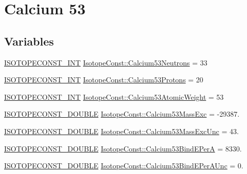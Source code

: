 \hypertarget{group___isotope_const-_calcium-_ca53}{}\section{Calcium 53}
\label{group___isotope_const-_calcium-_ca53}
\subsection*{Variables}
\begin{DoxyCompactItemize}
\item 
\mbox{\hyperlink{group___isotope_const-_macros_ga5f18360b3e99483a35c32d789e62621c}{I\+S\+O\+T\+O\+P\+E\+C\+O\+N\+S\+T\+\_\+\+I\+NT}} \mbox{\hyperlink{group___isotope_const-_calcium-_ca53_ga57c4847d66ff2899c56688d1ebc0bbe0}{Isotope\+Const\+::\+Calcium53\+Neutrons}} = 33
\item 
\mbox{\hyperlink{group___isotope_const-_macros_ga5f18360b3e99483a35c32d789e62621c}{I\+S\+O\+T\+O\+P\+E\+C\+O\+N\+S\+T\+\_\+\+I\+NT}} \mbox{\hyperlink{group___isotope_const-_calcium-_ca53_ga1bfb19fad118eebc96b4505f5ec441f9}{Isotope\+Const\+::\+Calcium53\+Protons}} = 20
\item 
\mbox{\hyperlink{group___isotope_const-_macros_ga5f18360b3e99483a35c32d789e62621c}{I\+S\+O\+T\+O\+P\+E\+C\+O\+N\+S\+T\+\_\+\+I\+NT}} \mbox{\hyperlink{group___isotope_const-_calcium-_ca53_gac76f80970411b4d5e64e327587920ee5}{Isotope\+Const\+::\+Calcium53\+Atomic\+Weight}} = 53
\item 
\mbox{\hyperlink{group___isotope_const-_macros_ga8f45a7272ce02c0b4c65c44636ed719a}{I\+S\+O\+T\+O\+P\+E\+C\+O\+N\+S\+T\+\_\+\+D\+O\+U\+B\+LE}} \mbox{\hyperlink{group___isotope_const-_calcium-_ca53_ga785835c89cadb8b5ba9963ea56235baf}{Isotope\+Const\+::\+Calcium53\+Mass\+Exc}} = -\/29387.
\item 
\mbox{\hyperlink{group___isotope_const-_macros_ga8f45a7272ce02c0b4c65c44636ed719a}{I\+S\+O\+T\+O\+P\+E\+C\+O\+N\+S\+T\+\_\+\+D\+O\+U\+B\+LE}} \mbox{\hyperlink{group___isotope_const-_calcium-_ca53_ga8104c5c4439b71ec543fc30f41ebcb0f}{Isotope\+Const\+::\+Calcium53\+Mass\+Exc\+Unc}} = 43.
\item 
\mbox{\hyperlink{group___isotope_const-_macros_ga8f45a7272ce02c0b4c65c44636ed719a}{I\+S\+O\+T\+O\+P\+E\+C\+O\+N\+S\+T\+\_\+\+D\+O\+U\+B\+LE}} \mbox{\hyperlink{group___isotope_const-_calcium-_ca53_gaf7a371d7214a1bab7fb6bd5e4c8d9f07}{Isotope\+Const\+::\+Calcium53\+Bind\+E\+PerA}} = 8330.
\item 
\mbox{\hyperlink{group___isotope_const-_macros_ga8f45a7272ce02c0b4c65c44636ed719a}{I\+S\+O\+T\+O\+P\+E\+C\+O\+N\+S\+T\+\_\+\+D\+O\+U\+B\+LE}} \mbox{\hyperlink{group___isotope_const-_calcium-_ca53_ga0e3f7a8b00eb2e5bd9720ba34600dba4}{Isotope\+Const\+::\+Calcium53\+Bind\+E\+Per\+A\+Unc}} = 0.

\end{DoxyCompactItemize}
